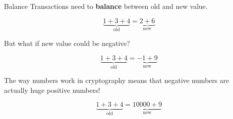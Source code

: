 \documentclass[aspectratio=169]{beamer}
\begin{document}
\begin{frame}{Balance}
    Transactions need to \textbf{balance} between old and new value.

    \begin{displaymath}
        \underbrace{1 + 3 + 4}_{\text{old}} = \underbrace{2 + 6}_{\text{new}}
    \end{displaymath}

    But what if new value could be negative?

    \begin{displaymath}
        \underbrace{1 + 3 + 4}_{\text{old}} = \underbrace{-1 + 9}_{\text{new}}
    \end{displaymath}

    The way numbers work in cryptography means that negative numbers are actually huge positive numbers!

    \begin{displaymath}
        \underbrace{1 + 3 + 4}_{\text{old}} = \underbrace{10000 + 9}_{\text{new}}
    \end{displaymath}
\end{frame}
\end{document}
